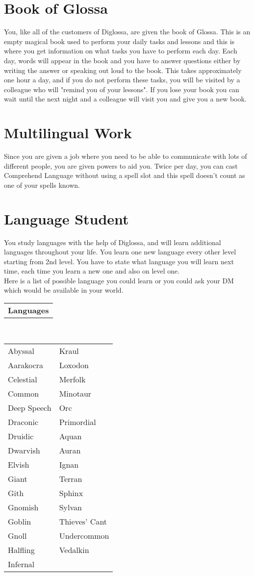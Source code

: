 \documentclass[11pt, A4paper, english]{article}
\begin{document}
	\section*{Book of Glossa}
You, like all of the customers of Diglossa, are given the book of Glossa. This is an empty magical book used to perform your daily tasks and lessons and this is where you get information on what tasks you have to perform each day. Each day, words will appear in the book and you have to answer questions either by writing the answer or speaking out loud to the book. This takes approximately one hour a day, and if you do not perform these tasks, you will be visited by a colleague who will "remind you of your lessons". If you lose your book you can wait until the next night and a colleague will visit you and give you a new book.

	\section*{Multilingual Work}
Since you are given a job where you need to be able to communicate with lots of different people, you are given powers to aid you. Twice per day, you can cast Comprehend Language without using a spell slot and this spell doesn't count as one of your spells known.

	\section*{Language Student}
You study languages with the help of Diglossa, and will learn additional languages throughout your life. You learn one new language every other level starting from 2nd level. You have to state what language you will learn next time, each time you learn a new one and also on level one. \\
Here is a list of possible language you could learn or you could ask your DM which would be available in your world. \\
		\begin{tabular}{l}
\textbf{Languages}
		\end{tabular} \\
		\begin{tabular}{l|l}
\hline
Abyssal & Kraul \\
Aarakocra & Loxodon \\
Celestial & Merfolk \\
Common & Minotaur \\
Deep Speech & Orc \\
Draconic & Primordial \\
Druidic & \indent Aquan \\
Dwarvish & \indent Auran \\
Elvish & \indent Ignan \\
Giant & \indent Terran \\
Gith & Sphinx \\
Gnomish & Sylvan \\
Goblin & Thieves' Cant \\
Gnoll & Undercommon\\
Halfling & Vedalkin \\
Infernal & \\
		\end{tabular}
\end{document}
